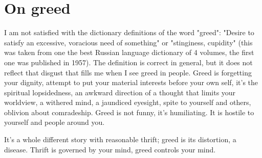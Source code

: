 \chapter{On greed}

I am not satisfied with the dictionary definitions of the word "greed": "Desire to satisfy an excessive, voracious need of something" or "stinginess, cupidity" (this was taken from one the best Russian language dictionary of 4 volumes, the first one was published in 1957). The definition is correct in general, but it does not reflect that disgust that fills me when I see greed in people. Greed is forgetting your dignity, attempt to put your material interests before your own self, it's the spiritual lopsidedness, an awkward direction of a thought that limits your worldview, a withered mind, a jaundiced eyesight, spite to yourself and others, oblivion about comradeship. Greed is not funny, it's humiliating. It is hostile to yourself and people around you.

It's a whole different story with reasonable thrift; greed is its distortion, a disease. Thrift is governed by your mind, greed controls your mind.